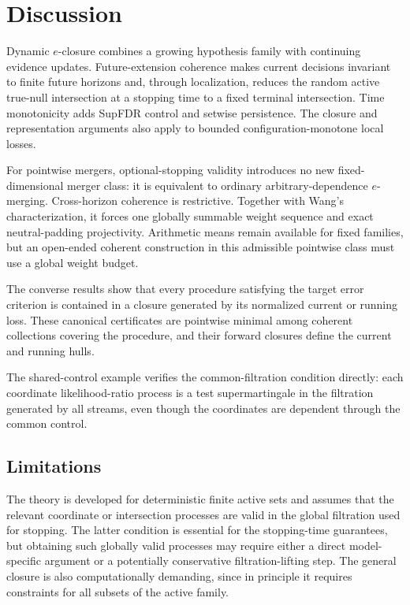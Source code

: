 \documentclass[11pt]{article}
\numberwithin{equation}{section}
\theoremstyle{plain}
\theoremstyle{definition}
\begin{document}
\section{Discussion}\label{sec:discussion}

Dynamic $e$-closure combines a growing hypothesis family with continuing evidence updates. Future-extension coherence makes current decisions invariant to finite future horizons and, through localization, reduces the random active true-null intersection at a stopping time to a fixed terminal intersection. Time monotonicity adds SupFDR control and setwise persistence. The closure and representation arguments also apply to bounded configuration-monotone local losses.

For pointwise mergers, optional-stopping validity introduces no new fixed-dimensional merger class: it is equivalent to ordinary arbitrary-dependence $e$-merging. Cross-horizon coherence is restrictive. Together with Wang's characterization, it forces one globally summable weight sequence and exact neutral-padding projectivity. Arithmetic means remain available for fixed families, but an open-ended coherent construction in this admissible pointwise class must use a global weight budget.

The converse results show that every procedure satisfying the target error criterion is contained in a closure generated by its normalized current or running loss. These canonical certificates are pointwise minimal among coherent collections covering the procedure, and their forward closures define the current and running hulls.

The shared-control example verifies the common-filtration condition directly: each coordinate likelihood-ratio process is a test supermartingale in the filtration generated by all streams, even though the coordinates are dependent through the common control.


\subsection{Limitations}\label{sec:limitations}

The theory is developed for deterministic finite active sets and assumes that the relevant coordinate or intersection processes are valid in the global filtration used for stopping. The latter condition is essential for the stopping-time guarantees, but obtaining such globally valid processes may require either a direct model-specific argument or a potentially conservative filtration-lifting step. The general closure is also computationally demanding, since in principle it requires constraints for all subsets of the active family.
\end{document}
